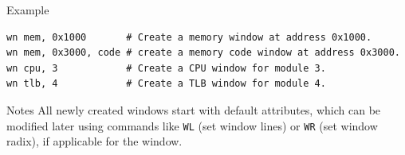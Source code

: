 \begin{iPageDescOpEntry}{Example}
\begin{lstlisting}[style=iPageOpStyle]
wn mem, 0x1000       # Create a memory window at address 0x1000.
wn mem, 0x3000, code # create a memory code window at address 0x3000.
wn cpu, 3            # Create a CPU window for module 3.
wn tlb, 4            # Create a TLB window for module 4.
\end{lstlisting}
\end{iPageDescOpEntry}

\begin{iPageDescEntry}{Notes}
All newly created windows start with default attributes, which can be modified
later using commands like \texttt{WL} (set window lines) or \texttt{WR} (set window radix), if applicable for the window.
\end{iPageDescEntry}
